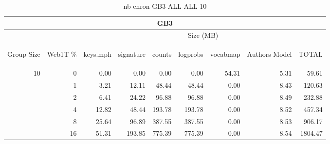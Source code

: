 \begin{center}
\begin{table}[htbp]
\begin{tabular}{ | r | r | r | r | r | r | r | r | r |}
\hline
\multicolumn{9}{|c|}{GB3}\\
\hline
 & & \multicolumn{7}{|c|}{Size (MB)}\\ \cline{3-9}
\begin{sideways}Group Size\end{sideways} & \begin{sideways}Web1T \% \end{sideways} & \begin{sideways}keys.mph\end{sideways} & \begin{sideways}signature\end{sideways} & \begin{sideways}counts\end{sideways} & \begin{sideways}logprobs\end{sideways} & \begin{sideways}vocabmap\end{sideways} & \begin{sideways}Authors Model \end{sideways} & \begin{sideways}TOTAL\end{sideways}\\
\hline
\multirow{5}{*}{10}
 & 0 & 0.00 & 0.00 & 0.00 & 0.00 & 54.31 & 5.31 & 59.61\\ \cline{2-9}
 & 1 & 3.21 & 12.11 & 48.44 & 48.44 & 0.00 & 8.43 & 120.63\\ \cline{2-9}
 & 2 & 6.41 & 24.22 & 96.88 & 96.88 & 0.00 & 8.49 & 232.88\\ \cline{2-9}
 & 4 & 12.82 & 48.44 & 193.78 & 193.78 & 0.00 & 8.52 & 457.34\\ \cline{2-9}
 & 8 & 25.64 & 96.89 & 387.55 & 387.55 & 0.00 & 8.53 & 906.17\\ \cline{2-9}
 & 16 & 51.31 & 193.85 & 775.39 & 775.39 & 0.00 & 8.54 & 1804.47\\ \cline{2-9}
\hline
\end{tabular}
\caption{nb-enron-GB3-ALL-ALL-10}
\label{table:nb-enron-GB3-ALL-ALL-10}
\end{table}
\end{center}

